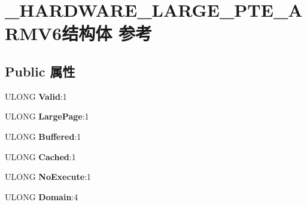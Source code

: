\hypertarget{struct___h_a_r_d_w_a_r_e___l_a_r_g_e___p_t_e___a_r_m_v6}{}\section{\+\_\+\+H\+A\+R\+D\+W\+A\+R\+E\+\_\+\+L\+A\+R\+G\+E\+\_\+\+P\+T\+E\+\_\+\+A\+R\+M\+V6结构体 参考}
\label{struct___h_a_r_d_w_a_r_e___l_a_r_g_e___p_t_e___a_r_m_v6}
\subsection*{Public 属性}
\begin{DoxyCompactItemize}
\item 
\mbox{\label{struct___h_a_r_d_w_a_r_e___l_a_r_g_e___p_t_e___a_r_m_v6_ac341e856cfe755a403536493ed5929a5}} 
U\+L\+O\+NG {\bfseries Valid}\+:1
\item 
\mbox{\label{struct___h_a_r_d_w_a_r_e___l_a_r_g_e___p_t_e___a_r_m_v6_aac1eedb980ec32a019fe9639fc99f758}} 
U\+L\+O\+NG {\bfseries Large\+Page}\+:1
\item 
\mbox{\label{struct___h_a_r_d_w_a_r_e___l_a_r_g_e___p_t_e___a_r_m_v6_a02d08552cf9f252f5e0a0715945b0945}} 
U\+L\+O\+NG {\bfseries Buffered}\+:1
\item 
\mbox{\label{struct___h_a_r_d_w_a_r_e___l_a_r_g_e___p_t_e___a_r_m_v6_a545df332a7cea8d5c2d2d74002e902fd}} 
U\+L\+O\+NG {\bfseries Cached}\+:1
\item 
\mbox{\label{struct___h_a_r_d_w_a_r_e___l_a_r_g_e___p_t_e___a_r_m_v6_a24c2021c80997a3a286637a101884f32}} 
U\+L\+O\+NG {\bfseries No\+Execute}\+:1
\item 
\mbox{\label{struct___h_a_r_d_w_a_r_e___l_a_r_g_e___p_t_e___a_r_m_v6_ad60770215840b09bb678aa6036c9a215}} 
U\+L\+O\+NG {\bfseries Domain}\+:4
\item 

\end{DoxyCompactItemize}
